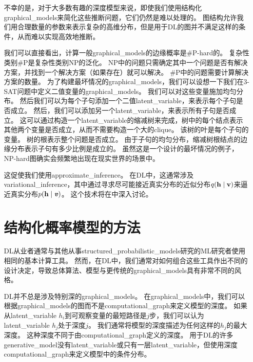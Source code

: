 不幸的是，对于大多数有趣的深度模型来说，即使我们使用结构化\gls{graphical_models}来简化这些推断问题，它们仍然是难以处理的。
图结构允许我们用合理数量的参数来表示复杂的高维分布，但是用于\gls{DL}的图并不满足这样的条件，从而难以实现高效地推断。


我们可以直接看出，计算一般\gls{graphical_models}的边缘概率是\#P-hard的。
复杂性类别\#P是复杂性类别NP的泛化。
NP中的问题只需确定其中一个问题是否有解决方案，并找到一个解决方案（如果存在）就可以解决。
\#P中的问题需要计算解决方案的数量。
为了构建最坏情况的\gls{graphical_models}，我们可以设想一下我们在3-SAT问题中定义二值变量的\gls{graphical_models}。
我们可以对这些变量施加均匀分布。
然后我们可以为每个子句添加一个二值\gls{latent_variable}，来表示每个子句是否成立。
然后，我们可以添加另一个\gls{latent_variable}，来表示所有子句是否成立。
这可以通过构造一个\gls{latent_variable}的缩减树来完成，树中的每个结点表示其他两个变量是否成立，从而不需要构造一个大的\gls{clique}。
该树的叶是每个子句的变量。
树的根表示整个问题是否成立。
由于子句的均匀分布，缩减树根结点的边缘分布表示子句有多少比例是成立的。
虽然这是一个设计的最坏情况的例子，NP-hard图确实会频繁地出现在现实世界的场景中。


这促使我们使用\gls{approximate_inference}。
在\gls{DL}中，这通常涉及\gls{variational_inference}，其中通过寻求尽可能接近真实分布的近似分布$q(\mathbf{h}\mid\mathbf{v})$来逼近真实分布$p(\mathbf{h}\mid\boldsymbol{\mathit{v}})$。
这个技术将在中深入讨论。



\section{结构化概率模型的方法}
\label{sec:the_deep_learning_approach_to_structured_probabilistic_models}

\gls{DL}从业者通常与其他从事\gls{structured_probabilistic_models}研究的\gls{ML}研究者使用相同的基本计算工具。
然而，在\gls{DL}中，我们通常对如何组合这些工具作出不同的设计决定，导致总体算法、模型与更传统的\gls{graphical_models}具有非常不同的风格。


\gls{DL}并不总是涉及特别深的\gls{graphical_models}。
在\gls{graphical_models}中，我们可以根据\gls{graphical_models}的图而不是\gls{computational_graph}来定义模型的深度。
如果从\gls{latent_variable} $h_i$到可观察变量的最短路径是$j$步，我们可以认为\gls{latent_variable} $h_j$处于深度$j$。
我们通常将模型的深度描述为任何这样的$h_j$的最大深度。 
这种深度不同于由\gls{computational_graph}定义的深度。
用于\gls{DL}的许多\gls{generative_model}没有\gls{latent_variable}或只有一层\gls{latent_variable}，但使用深度\gls{computational_graph}来定义模型中的条件分布。


